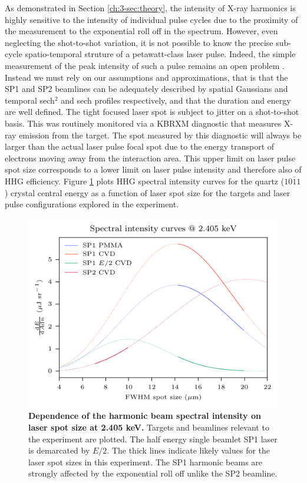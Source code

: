As demonstrated in Section \ref{ch:3-sec:theory}, the intensity of X-ray harmonics is highly sensitive to the intensity of individual pulse cycles due to the proximity of the measurement to the exponential roll off in the spectrum. However, even neglecting the shot-to-shot variation, it is not possible to know the precise sub-cycle spatio-temporal struture of a petawatt-class laser pulse. Indeed, the simple measurement of the peak intensity of such a pulse remains an open problem \cite{perevalovLaserPeelerRegime2023,ouatuIonizationStatesMultipetawatt2022}. Instead we must rely on our assumptions and approximations, that is that the SP1 and SP2 beamlines can be adequately described by spatial Gaussians and temporal sech$^2$ and sech profiles respectively, and that the duration and energy are well defined. The tight focused laser spot is subject to jitter on a shot-to-shot basis. This was routinely monitored via a KBRXM diagnostic that measures X-ray emission from the target. The spot measured by this diagnostic will always be larger than the actual laser pulse focal spot due to the energy transport of electrons moving away from the interaction area. This upper limit on laser pulse spot size corresponds to a lower limit on laser pulse intensity and therefore also of HHG efficiency. Figure \ref{fig:orionintensitycurves} plots HHG spectral intensity curves for the quartz ($10\bar{1}1$) crystal central energy as a function of laser spot size for the targets and laser pulse configurations explored in the experiment. 
\begin{figure}
	\centering
	\includegraphics{figures/orion/orion_intensity_curves}
	\caption[Dependence of the harmonic beam spectral intensity on laser spot size at 2.405 keV.]{\textbf{Dependence of the harmonic beam spectral intensity on laser spot size at 2.405 keV.} Targets and beamlines relevant to the experiment are plotted. The half energy single beamlet SP1 laser is demarcated by $E/2$. The thick lines indicate likely values for the laser spot sizes in this experiment. The SP1 harmonic beams are strongly affected by the exponential roll off unlike the SP2 beamline.}
	\label{fig:orionintensitycurves}
\end{figure}
